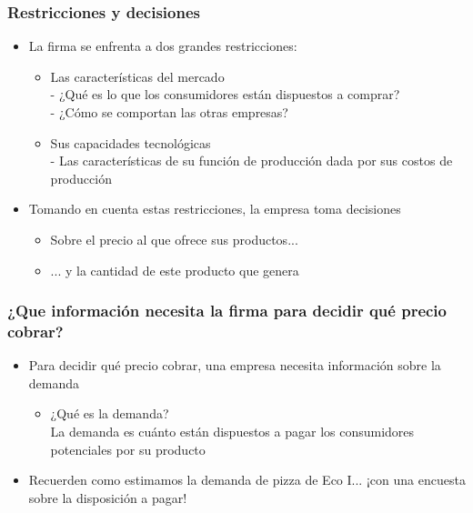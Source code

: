 \documentclass{beamer}
\begin{document}
\begin{frame}
\frametitle{Restricciones y decisiones}
\begin{itemize}
    \item La firma se enfrenta a dos grandes restricciones:
        \begin{itemize}
        \item Las características del mercado \\
        - ¿Qué es lo que los consumidores están dispuestos a comprar? \\
        - ¿Cómo se comportan las otras empresas?
        \item Sus capacidades tecnológicas \\
        - Las características de su función de producción dada por sus costos de producción
        \end{itemize}
    \item Tomando en cuenta estas restricciones, la empresa toma decisiones \\
    \begin{itemize}
        \item Sobre el precio al que ofrece sus productos...
        \item ... y la cantidad de este producto que genera
    \end{itemize}
\end{itemize} 
\end{frame}

\begin{frame}
\frametitle{¿Que información necesita la firma para decidir qué precio cobrar?}
\begin{itemize}
    \item Para decidir qué precio cobrar, una empresa necesita información sobre la demanda
    \begin{itemize}
        \item ¿Qué es la demanda? \\
    La demanda es cuánto están dispuestos a pagar los consumidores potenciales por su producto
    \end{itemize}
    \item Recuerden como estimamos la demanda de pizza de Eco I... ¡con una encuesta sobre la disposición a pagar!

\end{itemize}
\end{frame}
\end{document}
